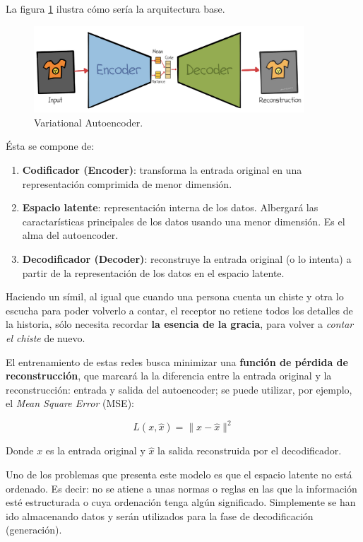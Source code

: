 La figura \ref{fig:vae} ilustra cómo sería la arquitectura base.

\begin{figure}[H]
  \centering
  \includegraphics[width=0.9\textwidth]{images/vae.png}
  \caption{Variational Autoencoder.}
  \label{fig:vae}
\end{figure}

Ésta se compone de:

\begin{enumerate}
    \item \textbf{Codificador (Encoder)}: transforma la entrada original en una representación comprimida de menor dimensión.
    \item \textbf{Espacio latente}: representación interna de los datos. Albergará las caractarísticas principales de los datos usando una menor dimensión. Es el alma del autoencoder.
    \item \textbf{Decodificador (Decoder)}: reconstruye la entrada original (o lo intenta) a partir de la representación de los datos en el espacio latente.
\end{enumerate}


Haciendo un símil, al igual que cuando una persona cuenta un chiste y otra lo escucha para poder volverlo a contar, el receptor no retiene todos los detalles de la historia, sólo necesita recordar \textbf{la esencia de la gracia}, para volver a \emph{contar el chiste} de nuevo.

El entrenamiento de estas redes busca minimizar una \textbf{función de pérdida de reconstrucción}, que marcará la la diferencia entre la entrada original y la reconstrucción: entrada y salida del autoencoder; se puede utilizar, por ejemplo, el \emph{Mean Square Error} (MSE):

\begin{equation}
    L(x, \hat{x}) = \| x - \hat{x} \|^2
\end{equation}

Donde \( x \) es la entrada original y \( \hat{x} \) la salida reconstruida por el decodificador.

Uno de los problemas que presenta este modelo es que el espacio latente no está ordenado. Es decir: no se atiene a unas normas o reglas en las que la información esté estructurada o cuya ordenación tenga algún significado. Simplemente se han ido almacenando datos y serán utilizados para la fase de decodificación (generación).

